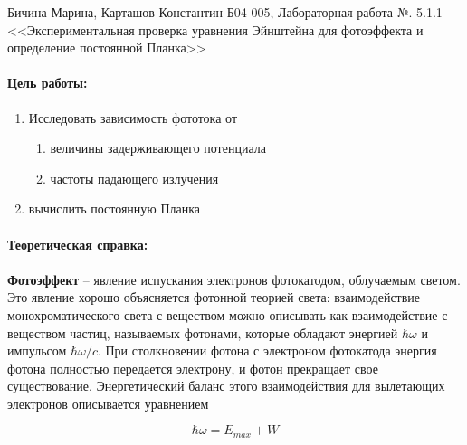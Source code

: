 \documentclass[a4paper,12pt]{article}
\author{Бичина Марина 
группа Б04-005 1 курса ФЭФМ}
\title{}
\date{}
\begin{document}

\begin{center}
\begin{Large}
{Бичина Марина, Карташов Константин Б04-005, Лабораторная работа №. 5.1.1 <<Экспериментальная проверка уравнения Эйнштейна для фотоэффекта и определение постоянной Планка>>}
\end{Large}
\end{center}
\paragraph{Цель работы:} 
\begin{enumerate}
\itemsep0em
\item Исследовать зависимость фототока от 
\begin{enumerate}
\itemsep0em
\item величины задерживающего потенциала
\item частоты падающего излучения
\end{enumerate}
\item вычислить постоянную Планка
\end{enumerate}

\paragraph{Теоретическая справка:}
\paragraph{}
\textbf{Фотоэффект} -- явление испускания электронов фотокатодом, облучаемым светом. Это явление хорошо объясняется фотонной теорией света: взаимодействие монохроматического света с веществом можно описывать как взаимодействие с веществом частиц, называемых фотонами, которые обладают энергией $ \hbar \omega $ и импульсом $ \hbar\omega/c $. При столкновении фотона с электроном фотокатода энергия фотона полностью передается электрону, и фотон прекращает свое существование. Энергетический баланс этого взаимодействия для вылетающих электронов описывается уравнением
	
\begin{equation}
\hbar \omega = E_{max} + W
\label{energy balance}
\end{equation}
	
\end{document}
